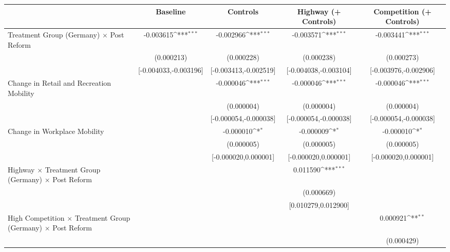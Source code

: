 {
\def\sym#1{\ifmmode^{#1}\else\(^{#1}\)\fi}
\begin{tabular}{l*{4}{c}}
\toprule
                    &\multicolumn{1}{c}{Baseline}&\multicolumn{1}{c}{Controls}&\multicolumn{1}{c}{Highway (+ Controls)}&\multicolumn{1}{c}{Competition (+ Controls)}\\
\midrule
Treatment Group (Germany) $\times$ Post Reform&   -0.003615\sym{***}&   -0.002966\sym{***}&   -0.003571\sym{***}&   -0.003441\sym{***}\\
                    &  (0.000213)         &  (0.000228)         &  (0.000238)         &  (0.000273)         \\
                    &[-0.004033,-0.003196]         &[-0.003413,-0.002519]         &[-0.004038,-0.003104]         &[-0.003976,-0.002906]         \\
Change in Retail and Recreation Mobility&                     &   -0.000046\sym{***}&   -0.000046\sym{***}&   -0.000046\sym{***}\\
                    &                     &  (0.000004)         &  (0.000004)         &  (0.000004)         \\
                    &                     &[-0.000054,-0.000038]         &[-0.000054,-0.000038]         &[-0.000054,-0.000038]         \\
Change in Workplace Mobility&                     &   -0.000010\sym{*}  &   -0.000009\sym{*}  &   -0.000010\sym{*}  \\
                    &                     &  (0.000005)         &  (0.000005)         &  (0.000005)         \\
                    &                     &[-0.000020,0.000001]         &[-0.000020,0.000001]         &[-0.000020,0.000001]         \\
Highway $\times$ Treatment Group (Germany) $\times$ Post Reform&                     &                     &    0.011590\sym{***}&                     \\
                    &                     &                     &  (0.000669)         &                     \\
                    &                     &                     &[0.010279,0.012900]         &                     \\
High Competition $\times$ Treatment Group (Germany) $\times$ Post Reform&                     &                     &                     &    0.000921\sym{**} \\
                    &                     &                     &                     &  (0.000429)         \\

\end{tabular}}
